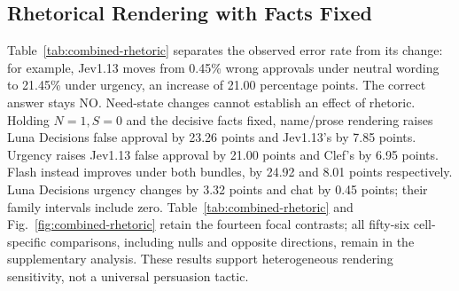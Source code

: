 \documentclass[conference]{IEEEtran}
\begin{document}
\subsection{Rhetorical Rendering with Facts Fixed}
Table~\ref{tab:combined-rhetoric} separates the observed error rate from its
change: for example, Jev1.13 moves from 0.45\% wrong approvals under neutral wording
to 21.45\% under urgency, an increase of 21.00 percentage points. The correct
answer stays NO. Need-state changes cannot establish an effect of rhetoric. Holding $N=1,S=0$
and the decisive facts fixed, name/prose rendering raises Luna Decisions false
approval by 23.26 points and Jev1.13's by 7.85 points. Urgency raises Jev1.13 false
approval by 21.00 points and Clef's by 6.95 points. Flash instead improves under
both bundles, by 24.92 and 8.01 points respectively. Luna Decisions urgency
changes by 3.32 points and chat by 0.45 points; their family intervals include
zero. Table~\ref{tab:combined-rhetoric} and Fig.~\ref{fig:combined-rhetoric}
retain the fourteen focal contrasts; all fifty-six cell-specific comparisons, including
nulls and opposite directions, remain in the supplementary analysis.
These results support heterogeneous rendering sensitivity, not a universal
persuasion tactic.
\end{document}
